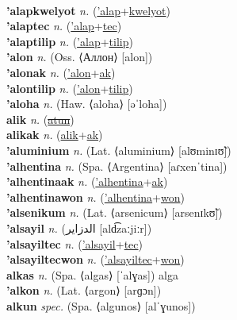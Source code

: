  \label{'alaplawt} \\
\textbf{'alapkwelyot} \textit{n.} (\hyperref['alap]{'alap}+\hyperref[kwelyot]{kwelyot})
 \label{'alapkwelyot} \\
\textbf{'alaptec} \textit{n.} (\hyperref['alap]{'alap}+\hyperref[tec]{tec})
 \label{'alaptec} \\
\textbf{'alaptilip} \textit{n.} (\hyperref['alap]{'alap}+\hyperref[tilip]{tilip})
 \label{'alaptilip} \\
\textbf{'alon} \textit{n.} (Oss. ⟨Аллон⟩ [alon])
 \label{'alon} \\
\textbf{'alonak} \textit{n.} (\hyperref['alon]{'alon}+\hyperref[ak]{ak})
 \label{'alonak} \\
\textbf{'alontilip} \textit{n.} (\hyperref['alon]{'alon}+\hyperref[tilip]{tilip})
 \label{'alontilip} \\
\textbf{'aloha} \textit{n.} (Haw. ⟨aloha⟩ [əˈloha])
 \label{'aloha} \\
\textbf{alik} \textit{n.} (\hyperref[atun]{\sout{atun}})
 \label{alik} \\
\textbf{alikak} \textit{n.} (\hyperref[alik]{alik}+\hyperref[ak]{ak})
 \label{alikak} \\
\textbf{'aluminium} \textit{n.} (Lat. ⟨aluminium⟩ [alʊminɪʊ̃])
 \label{'aluminium} \\
\textbf{'alhentina} \textit{n.} (Spa. ⟨Argentina⟩ [aɾxenˈtina])
 \label{'alhentina} \\
\textbf{'alhentinaak} \textit{n.} (\hyperref['alhentina]{'alhentina}+\hyperref[ak]{ak})
 \label{'alhentinaak} \\
\textbf{'alhentinawon} \textit{n.} (\hyperref['alhentina]{'alhentina}+\hyperref[won]{won})
 \label{'alhentinawon} \\
\textbf{'alsenikum} \textit{n.} (Lat. ⟨arsenicum⟩ [arsenɪkʊ̃])
 \label{'alsenikum} \\
\textbf{'alsayil} \textit{n.} ({\arabics{}الدزاير} [ald͡zaːjiːr])
 \label{'alsayil} \\
\textbf{'alsayiltec} \textit{n.} (\hyperref['alsayil]{'alsayil}+\hyperref[tec]{tec})
 \label{'alsayiltec} \\
\textbf{'alsayiltecwon} \textit{n.} (\hyperref['alsayiltec]{'alsayiltec}+\hyperref[won]{won})
 \label{'alsayiltecwon} \\
\textbf{alkas} \textit{n.} (Spa. ⟨algas⟩ [ˈalɣas])
alga \label{alkas} \\
\textbf{'alkon} \textit{n.} (Lat. ⟨argon⟩ [arɡɔn])
 \label{'alkon} \\
\textbf{alkun} \textit{spec.} (Spa. ⟨algunos⟩ [alˈɣunos])

